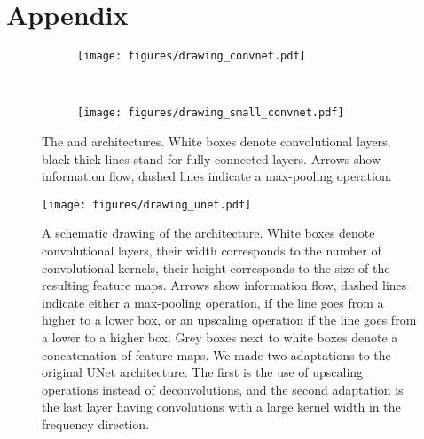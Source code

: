 \section*{Appendix}
\begin{figure}[ht]
  \centering

  \begin{subfigure}[b]{0.2\textwidth}
  \texttt{[image: figures/drawing\_convnet.pdf]}
  \caption{\ConvNet}
  \label{fig:drawing_convnet}
  \end{subfigure}
  ~
  \begin{subfigure}[b]{0.2\textwidth}
  \texttt{[image: figures/drawing\_small\_convnet.pdf]}
  \caption{\SmallConvNet}
  \label{fig:drawing_small_convnet}
  \end{subfigure}

  \caption{The \ConvNet and \SmallConvNet architectures. White boxes denote convolutional layers, black thick lines stand for fully connected layers. Arrows show information flow, dashed lines indicate a max-pooling operation.}
\end{figure}

\begin{figure*}[ht]
  \centering
  \texttt{[image: figures/drawing\_unet.pdf]}
  \caption{A schematic drawing of the \AUNet architecture. White boxes denote convolutional layers, their width corresponds to the number of convolutional kernels, their height corresponds to the size of the resulting feature maps. Arrows show information flow, dashed lines indicate either a max-pooling operation, if the line goes from a higher to a lower box, or an upscaling operation if the line goes from a lower to a higher box. Grey boxes next to white boxes denote a concatenation of feature maps. We made two adaptations to the original UNet architecture. The first is the use of upscaling operations instead of deconvolutions, and the second adaptation is the last layer having convolutions with a large kernel width in the frequency direction. \label{fig:drawing_unet}}
\end{figure*}


